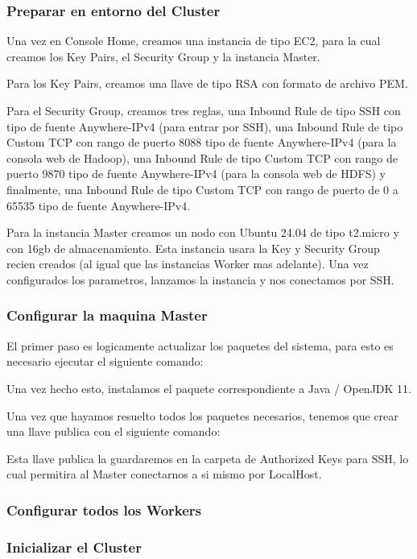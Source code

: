\documentclass[12pt,letterpaper,twoside]{article}
\begin{document}
\subsubsection*{Preparar en entorno del Cluster}

Una vez en Console Home, creamos una instancia de tipo EC2, para la cual creamos los Key Pairs, el Security Group y la instancia
Master.

Para los Key Pairs, creamos una llave de tipo RSA con formato de archivo PEM.

Para el Security Group, creamos tres reglas, 
una Inbound Rule de tipo SSH con tipo de fuente Anywhere-IPv4
(para entrar por SSH),
una Inbound Rule de tipo Custom TCP con rango de puerto 8088 tipo de fuente Anywhere-IPv4
(para la consola web de Hadoop),
una Inbound Rule de tipo Custom TCP con rango de puerto 9870 tipo de fuente Anywhere-IPv4
(para la consola web de HDFS)
y finalmente, una Inbound Rule de tipo Custom TCP con rango de puerto de 0 a 65535 tipo de 
fuente Anywhere-IPv4.

Para la instancia Master creamos un nodo con Ubuntu 24.04 de tipo t2.micro y con 16gb de almacenamiento.
Esta instancia usara la Key y Security Group recien creados (al igual que las instancias Worker mas adelante). 
Una vez configurados los parametros, lanzamos la instancia y nos conectamos por SSH.

\subsubsection*{Configurar la maquina Master}

El primer paso es logicamente actualizar los paquetes del sistema, para esto es necesario ejecutar el siguiente
comando:

Una vez hecho esto, instalamos el paquete correspondiente a Java / OpenJDK 11.

Una vez que hayamos resuelto todos los paquetes necesarios, tenemos que crear una llave publica con el siguiente
comando:

Esta llave publica la guardaremos en la carpeta de Authorized Keys para SSH, lo cual permitira al Master
conectarnos a si mismo por LocalHost.

\subsubsection*{Configurar todos los Workers}
\subsubsection*{Inicializar el Cluster}
\end{document}

